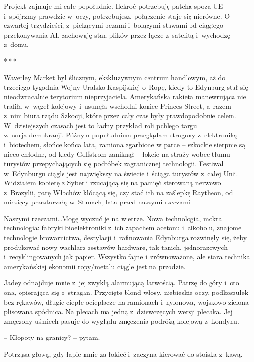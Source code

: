 \documentclass[oneside,polish,12pt,sfheadings]{mwbk}
\newcommand{\threeast}{\bigskip\par\centerline{*\,*\,*}\medskip\par}%
\begin{document}
Projekt zajmuje mi całe popołudnie. Ilekroć potrzebuję patcha spoza UE i~spójrzmy prawdzie w~oczy, potrzebujesz, połączenie staje się nierówne. O
czwartej trzydzieści, z~piekącymi oczami i~bolącymi stawami od ciągłego
przekonywania AI, zachowuję stan plików przez łącze z~satelitą i~wychodzę z~domu.

\threeast

Waverley Market był ślicznym, ekskluzywnym centrum handlowym, aż do
trzeciego tygodnia Wojny Uralsko-Kaspijskiej o~Ropę, kiedy to Edynburg
stał się nieodwracalnie terytorium nieprzyjaciela. Amerykańska rakieta
manewrująca nie trafiła w~węzeł kolejowy i~usunęła wschodni koniec
Princes Street, a~razem z~nim biura rządu Szkocji, które przez cały czas
były prawdopodobnie celem. W~dzisiejszych czasach jest to ładny przykład
roli pchlego targu w~socjaldemokracji. Późnym popołudniem przeglądam
stragany z~elektroniką i~biotechem, słońce końca lata, ramiona zgarbione
w parce -- szkockie sierpnie są nieco chłodne, od kiedy Golfstrom
zaniknął -- łokcie na straży wobec tłumu turystów przepychających się
podróbek zagranicznej technologii. Festiwal w~Edynburgu ciągle jest
największy na świecie i~ściąga turystów z~całej Unii. Widziałem kobietę
z Syberii rzucającą się na pamięć sterowaną nerwowo z~Brazylii, parę
Włochów kłócącą się, czy stać ich na zaślepkę Raytheon, od miesięcy
przestarzałą w~Stanach, lata przed naszymi rzeczami.

Naszymi rzeczami\ldots Mogę wyczuć je na wietrze. Nowa technologia, mokra
technologia: fabryki bioelektroniki z~ich zapachem acetonu i~alkoholu,
znajome technologie browarnictwa, destylacji i~rafinowania Edynburga
rozwinęły się, żeby produkować nowy wachlarz zestawów hardware, tak
tanich, jednorazowych i~recyklingowanych jak papier. Wszystko fajne i~zrównoważone, ale stara technika amerykańskiej ekonomii ropy/metalu
ciągle jest na przodzie.

Jadey odnajduje mnie z~jej zwykłą alarmującą łatwością. Patrzę do góry i~oto ona, opierająca się o~stragan. Przycięte blond włosy, niebieskie
oczy, podkoszulek bez rękawów, długie ciepłe ocieplacze na ramionach i~nylonowa, wojskowo zielona plisowana spódnica. Na plecach ma jedną z~dziewczęcych wersji plecaka. Jej zmęczony uśmiech pasuje do wyglądu
zmęczenia podróżą kolejową z~Londynu.

-- Kłopoty na granicy? -- pytam.

Potrząsa głową, gdy łapie mnie za łokieć i~zaczyna kierować do stoiska z~kawą. 
\end{document}
